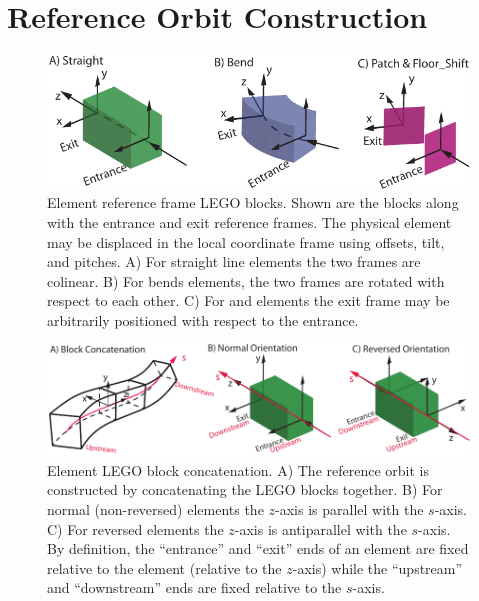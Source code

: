 \section{Reference Orbit Construction}
\label{s:ref.construct}


  \begin{figure}[tb]
  \centering
  \includegraphics{element-coord-frame.pdf}
\caption[Element LEGO blocks.]{Element reference frame LEGO
blocks. Shown are the blocks along with the entrance and exit
reference frames. The physical element may be displaced in the local
coordinate frame using offsets, tilt, and pitches. A) For straight
line elements the two frames are colinear. B) For bends elements, the
two frames are rotated with respect to each other. C) For 
and  elements the exit frame may be arbitrarily
positioned with respect to the entrance.}
  \label{f:ele.coord.frame}
  \end{figure}


\begin{figure}[tb]
  \centering
  \includegraphics{element-stream.pdf}
  \caption[Element LEGO block concatenation.]{
Element LEGO block concatenation. A) The reference orbit is
constructed by concatenating the LEGO blocks together. B) For normal
(non-reversed) elements the $z$-axis is parallel with the $s$-axis. C)
For reversed elements the $z$-axis is antiparallel with the
$s$-axis. By definition, the ``entrance'' and ``exit'' ends of an
element are fixed relative to the element (relative to the $z$-axis)
while the ``upstream'' and ``downstream'' ends are fixed relative to
the $s$-axis.}
  \label{f:stream}
\end{figure}

